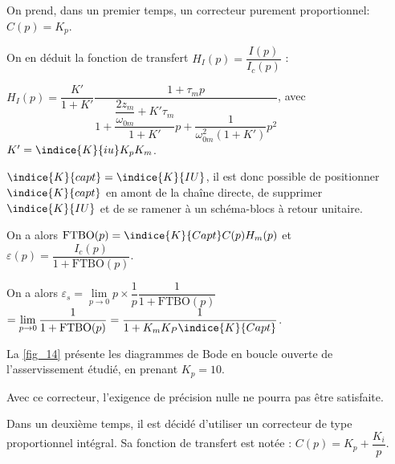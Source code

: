 \begin{multicols}{2}
\begin{corrige}
\end{corrige}
\else
\fi

\ifprof
\else

On prend, dans un premier temps, un correcteur purement proportionnel: $C(p)=K_p$.

On en déduit la fonction de transfert $H_I(p)=\dfrac{I(p)}{I_c(p)}$ :

$H_I(p)=\dfrac{K'}{1+K'}\dfrac{1+\tau_m p}{1+  
\dfrac{\dfrac{2z_m}{\omega_{0m}}+ K'\tau_m}{1+K'}p 
+ \dfrac{1}{\omega_{0m}^2(1+K')} p^2}$, avec $K'=\indice{K}{iu}K_pK_m$.

\fi

\ifprof
\begin{corrige}
$\indice{K}{capt}=\indice{K}{IU}$, il est donc possible de positionner $\indice{K}{capt}$ en amont de la chaîne directe, de supprimer $\indice{K}{IU}$ et de se ramener à un schéma-blocs à retour unitaire. 

On a alors $\text{FTBO}(p)=\indice{K}{Capt}C(p)H_m(p)$ et 
$\varepsilon(p)=\dfrac{I_c(p)}{1+\text{FTBO}(p)}$.

On a alors $\varepsilon_s = \lim\limits_{p \to 0 } p\times\dfrac{1}{p}\dfrac{1}{1+\text{FTBO}(p)}$  
$= \lim\limits_{p \to 0 } \dfrac{1}{1+\text{FTBO}(p)} = \dfrac{1}{1+K_m K_P \indice{K}{Capt}} $.
\end{corrige}
\else
\fi

\ifprof
\else

La \autoref{fig_14} présente les diagrammes de Bode en boucle ouverte de l’asservissement étudié, en prenant $K_p=10$.
\fi

\ifprof
\begin{corrige}
Avec ce correcteur, l'exigence de précision nulle ne pourra pas être satisfaite.
\end{corrige}
\else
\fi

\ifprof
\else

Dans un deuxième temps, il est décidé d’utiliser un correcteur de type proportionnel intégral. Sa fonction de transfert est notée : $C(p)=K_p+\dfrac{K_i}{p}$.
\fi

%
%


\end{multicols}
